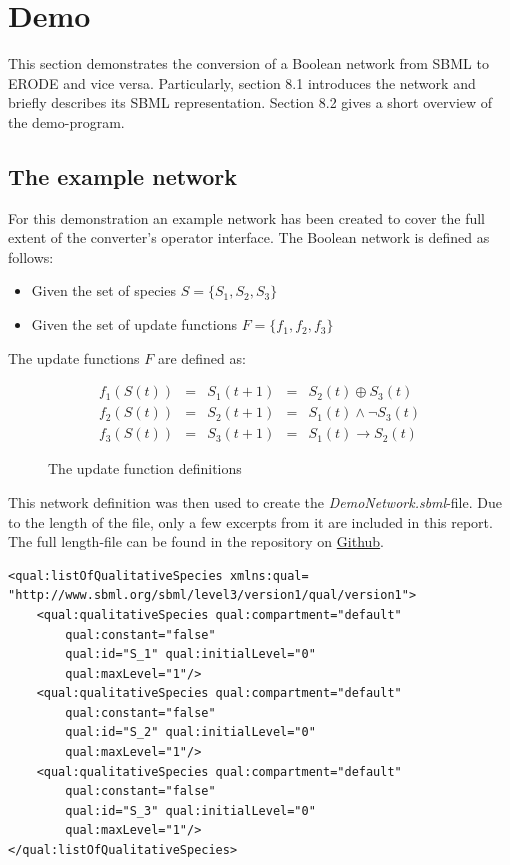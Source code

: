 \chapter{Demo}
This section demonstrates the conversion of a Boolean network from SBML to ERODE and vice versa. Particularly, section 8.1 introduces the network and briefly describes its SBML representation. Section 8.2 gives a short overview of the demo-program.

\section{The example network}
For this demonstration an example network has been created to cover the full extent of the converter's operator interface. The Boolean network is defined as follows:
\begin{itemize}
    \item Given the set of species $S = \{S_1,S_2,S_3\}$
    \item Given the set of update functions $F = \{f_1,f_2,f_3\}$
\end{itemize}
The update functions $F$ are defined as:
\begin{figure}[H]
    \centering
    \[
    \begin{array}{rrrcl}
        f_1(S(t))&=&S_1(t+1) &=& S_2(t) \oplus S_3(t) \\
        f_2(S(t))&=&S_2(t+1) &=& S_1(t) \land \neg{S_3(t)} \\
        f_3(S(t))&=&S_3(t+1) &=& S_1(t) \rightarrow S_2(t)
    \end{array}
    \]
    \caption{The update function definitions}
    \label{fig:exampleBN}
\end{figure}

This network definition was then used to create the \emph{DemoNetwork.sbml}-file. Due to the length of the file, only a few excerpts from it are included in this report. The full length-file can be found in the repository on \href{https://github.com/Unfunctioned/SBML-Converter-for-ERODE}{Github}.

\begin{lstlisting}[language=SBML, caption=The species definitions of the network]
<qual:listOfQualitativeSpecies xmlns:qual=
"http://www.sbml.org/sbml/level3/version1/qual/version1">
  	<qual:qualitativeSpecies qual:compartment="default" 
  	    qual:constant="false"
  	    qual:id="S_1" qual:initialLevel="0"
  	    qual:maxLevel="1"/>
  	<qual:qualitativeSpecies qual:compartment="default" 
  	    qual:constant="false"
  	    qual:id="S_2" qual:initialLevel="0"
  	    qual:maxLevel="1"/>
  	<qual:qualitativeSpecies qual:compartment="default" 
  	    qual:constant="false"
  	    qual:id="S_3" qual:initialLevel="0"
  	    qual:maxLevel="1"/>
</qual:listOfQualitativeSpecies>
\end{lstlisting}

